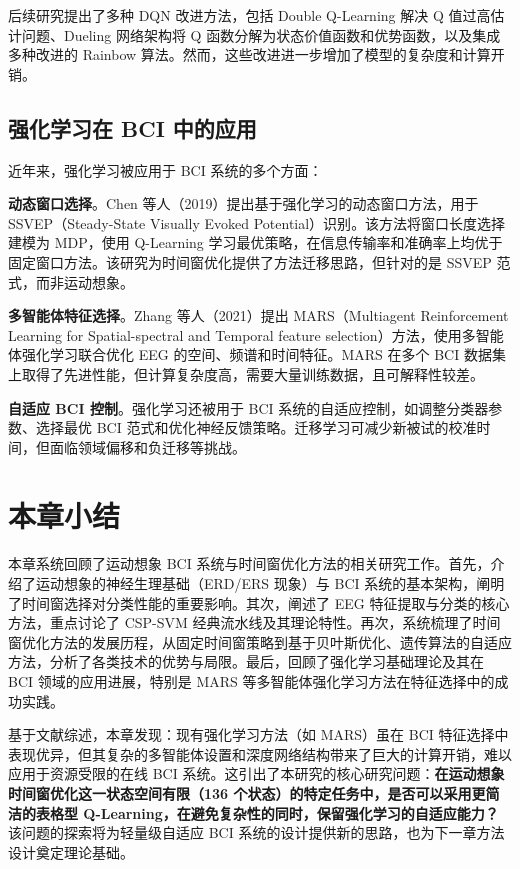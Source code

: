 后续研究提出了多种 DQN 改进方法，包括 Double Q-Learning 解决 Q 值过高估计问题\cite{van2016deep}、Dueling 网络架构将 Q 函数分解为状态价值函数和优势函数\cite{wang2016dueling}，以及集成多种改进的 Rainbow 算法\cite{hessel2018rainbow}。然而，这些改进进一步增加了模型的复杂度和计算开销。

\subsection{强化学习在 BCI 中的应用}
\label{subsec:rl_bci_applications}

近年来，强化学习被应用于 BCI 系统的多个方面\cite{zhang2021mars}：

\textbf{动态窗口选择}。Chen 等人（2019）提出基于强化学习的动态窗口方法，用于 SSVEP（Steady-State Visually Evoked Potential）识别\cite{chen2019dynamic}。该方法将窗口长度选择建模为 MDP，使用 Q-Learning 学习最优策略，在信息传输率和准确率上均优于固定窗口方法。该研究为时间窗优化提供了方法迁移思路，但针对的是 SSVEP 范式，而非运动想象。

\textbf{多智能体特征选择}。Zhang 等人（2021）提出 MARS（Multiagent Reinforcement Learning for Spatial-spectral and Temporal feature selection）方法，使用多智能体强化学习联合优化 EEG 的空间、频谱和时间特征\cite{zhang2021mars}。MARS 在多个 BCI 数据集上取得了先进性能，但计算复杂度高，需要大量训练数据，且可解释性较差。

\textbf{自适应 BCI 控制}。强化学习还被用于 BCI 系统的自适应控制，如调整分类器参数、选择最优 BCI 范式和优化神经反馈策略\cite{jayaram2016transfer}。迁移学习可减少新被试的校准时间，但面临领域偏移和负迁移等挑战。

\section{本章小结}
本章系统回顾了运动想象 BCI 系统与时间窗优化方法的相关研究工作。首先，介绍了运动想象的神经生理基础（ERD/ERS 现象）与 BCI 系统的基本架构，阐明了时间窗选择对分类性能的重要影响。其次，阐述了 EEG 特征提取与分类的核心方法，重点讨论了 CSP-SVM 经典流水线及其理论特性。再次，系统梳理了时间窗优化方法的发展历程，从固定时间窗策略到基于贝叶斯优化、遗传算法的自适应方法，分析了各类技术的优势与局限。最后，回顾了强化学习基础理论及其在 BCI 领域的应用进展，特别是 MARS 等多智能体强化学习方法在特征选择中的成功实践。

基于文献综述，本章发现：现有强化学习方法（如 MARS）虽在 BCI 特征选择中表现优异，但其复杂的多智能体设置和深度网络结构带来了巨大的计算开销，难以应用于资源受限的在线 BCI 系统。这引出了本研究的核心研究问题：\textbf{在运动想象时间窗优化这一状态空间有限（136 个状态）的特定任务中，是否可以采用更简洁的表格型 Q-Learning，在避免复杂性的同时，保留强化学习的自适应能力？} 该问题的探索将为轻量级自适应 BCI 系统的设计提供新的思路，也为下一章方法设计奠定理论基础。


